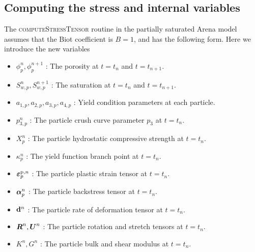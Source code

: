 \documentclass[11pt,a4paper]{article}
\begin{document}
\subsection{Computing the stress and internal variables}
The \textsc{computeStressTensor} routine in the partially saturated Arena model assumes
that the Biot coefficient is $B = 1$, and has the following form.  Here we introduce the new variables
\begin{itemize} 
  \setlength\itemsep{-5pt}
  \item $\phi_p^n, \phi_p^{n+1}$ : {\Ochre The porosity at $t = t_n$ and $t = t_{n+1}$.}
  \item $S_{w,p}^n, S_{w,p}^{n+1}$ : {\Ochre The saturation at $t = t_n$ and $t = t_{n+1}$.}
  \item $a_{1,p}, a_{2,p}, a_{3,p}, a_{4,p}$ : {\Ochre Yield condition parameters at each particle.}
  \item $p^n_{3,p}$ : {\Ochre The particle crush curve parameter $p_3$ at $t = t_n$.}
  \item $X_p^n$ : {\Ochre The particle hydrostatic compressive strength at $t = t_n$.}
  \item $\kappa_p^n$ : {\Ochre The yield function branch point at $t = t_n$.}
  \item $\boldsymbol{\varepsilon}_{p}^{\text{p},n}$ : {\Ochre The particle plastic strain tensor at $t = t_n$.}
  \item $\boldsymbol{\alpha}_{p}^{n}$ : {\Ochre The particle backstress tensor at $t = t_n$.}
  \item $\mathbf{d}^{n}$ : {\Ochre The particle rate of deformation tensor at $t = t_n$.}
  \item $\boldsymbol{R}^{n}, \boldsymbol{U}^n$ : {\Ochre The particle rotation and stretch tensors at $t = t_n$.}
  \item $K^{n}, G^n$ : {\Ochre The particle bulk and shear modulus at $t = t_n$.}
\end{itemize}
\end{document}
